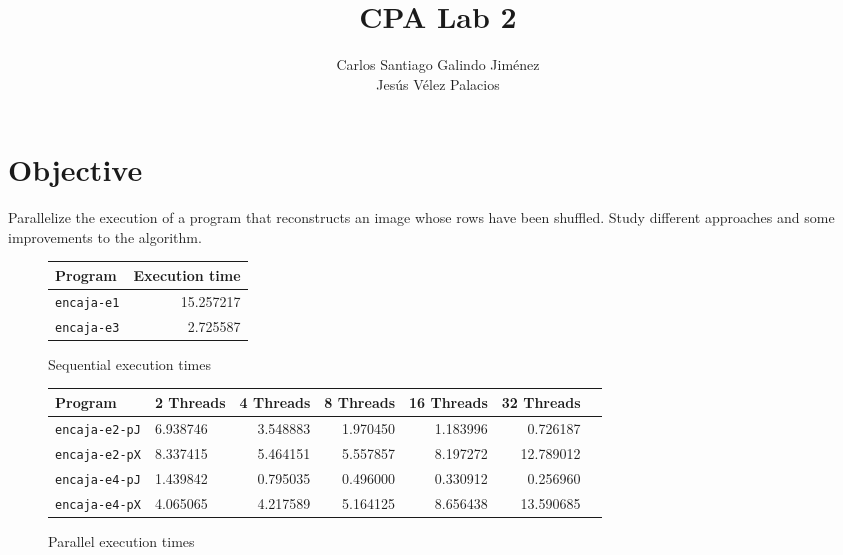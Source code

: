 \documentclass[a4paper]{article}
\title{CPA Lab 2}
\author{Carlos Santiago Galindo Jiménez\\Jesús Vélez Palacios}
\begin{document}
\maketitle
\section{Objective}
Parallelize the execution of a program that reconstructs an image whose rows have been shuffled. Study different approaches and some improvements to the algorithm.




\begin{figure}[h]
    \centering
    \begin{tabular}{l r}
        Program            & Execution time \\ \hline
        \texttt{encaja-e1} & 15.257217      \\
        \texttt{encaja-e3} &  2.725587      \\
    \end{tabular}
    \caption{Sequential execution times}
\end{figure}
\begin{figure}[h]
    \centering
    \begin{tabular}{l l r r r r r}
        Program               & 2 Threads & 4 Threads & 8 Threads & 16 Threads & 32 Threads \\ \hline
        \texttt{encaja-e2-pJ} & 6.938746  & 3.548883  & 1.970450  & 1.183996   & 0.726187   \\
        \texttt{encaja-e2-pX} & 8.337415  & 5.464151  & 5.557857  & 8.197272   & 12.789012  \\
        \texttt{encaja-e4-pJ} & 1.439842  & 0.795035  & 0.496000  & 0.330912   & 0.256960   \\
        \texttt{encaja-e4-pX} & 4.065065  & 4.217589  & 5.164125  & 8.656438   & 13.590685  \\
    \end{tabular}
    \caption{Parallel execution times}
\end{figure}
\end{document}
